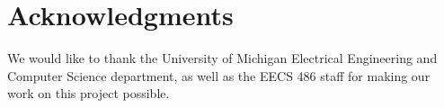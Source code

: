 \documentclass[11pt,a4paper]{article}
\begin{document}


  \section*{Acknowledgments}

  We would like to thank the University of Michigan Electrical Engineering and Computer Science department, as well as the EECS 486 staff for making our work on this project possible.

  \nocite{WI:03}
  
  

  \appendix


  
\end{document}
